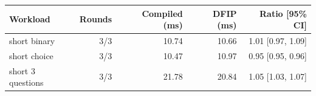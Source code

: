 \begin{tabular}{lrrrr}
\toprule
Workload & Rounds & Compiled (ms) & DFIP (ms) & Ratio [95\% CI] \\
\midrule
short binary & 3/3 & 10.74 & 10.66 & 1.01 [0.97, 1.09] \\
short choice & 3/3 & 10.47 & 10.97 & 0.95 [0.95, 0.96] \\
short 3 questions & 3/3 & 21.78 & 20.84 & 1.05 [1.03, 1.07] \\
\bottomrule
\end{tabular}
